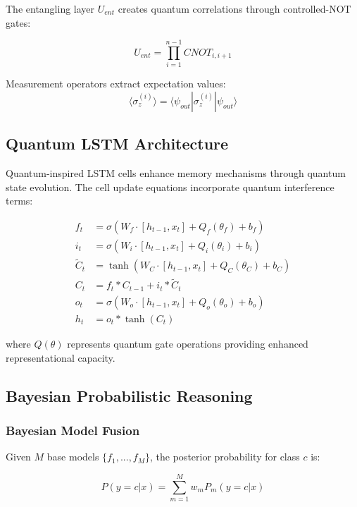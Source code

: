\documentclass[conference]{IEEEtran}
\begin{document}
The entangling layer $U_{ent}$ creates quantum correlations through controlled-NOT gates:

\begin{equation}
U_{ent} = \prod_{i=1}^{n-1} CNOT_{i,i+1}
\end{equation}

Measurement operators extract expectation values:
\begin{equation}
\langle \sigma_z^{(i)} \rangle = \langle \psi_{out} | \sigma_z^{(i)} | \psi_{out} \rangle
\end{equation}

\subsection{Quantum LSTM Architecture}

Quantum-inspired LSTM cells enhance memory mechanisms through quantum state evolution. The cell update equations incorporate quantum interference terms:

\begin{align}
f_t &= \sigma(W_f \cdot [h_{t-1}, x_t] + Q_f(\theta_f) + b_f) \\
i_t &= \sigma(W_i \cdot [h_{t-1}, x_t] + Q_i(\theta_i) + b_i) \\
\tilde{C}_t &= \tanh(W_C \cdot [h_{t-1}, x_t] + Q_C(\theta_C) + b_C) \\
C_t &= f_t \ast C_{t-1} + i_t \ast \tilde{C}_t \\
o_t &= \sigma(W_o \cdot [h_{t-1}, x_t] + Q_o(\theta_o) + b_o) \\
h_t &= o_t \ast \tanh(C_t)
\end{align}

where $Q(\theta)$ represents quantum gate operations providing enhanced representational capacity.

\subsection{Bayesian Probabilistic Reasoning}

\subsubsection{Bayesian Model Fusion}
Given $M$ base models $\{f_1, ..., f_M\}$, the posterior probability for class $c$ is:

\begin{equation}
P(y=c|x) = \sum_{m=1}^{M} w_m P_m(y=c|x)
\end{equation}
\end{document}
